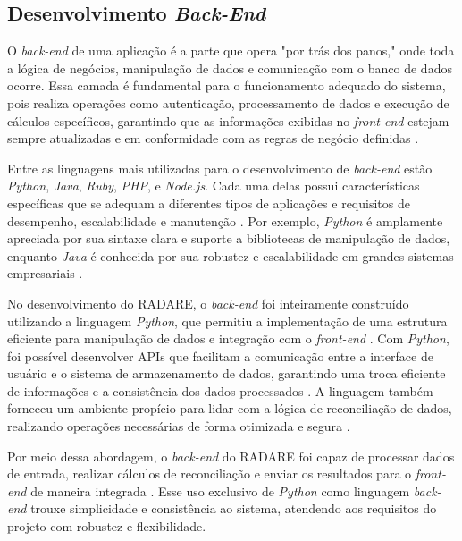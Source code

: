 \subsection{Desenvolvimento \textit{Back-End}}

O \textit{back-end} de uma aplicação é a parte que opera "por trás dos panos," onde toda a lógica de negócios, manipulação de dados e comunicação com o banco de dados ocorre. Essa camada é fundamental para o funcionamento adequado do sistema, pois realiza operações como autenticação, processamento de dados e execução de cálculos específicos, garantindo que as informações exibidas no \textit{front-end} estejam sempre atualizadas e em conformidade com as regras de negócio definidas \cite{backendroles}.

Entre as linguagens mais utilizadas para o desenvolvimento de \textit{back-end} estão \textit{Python}, \textit{Java}, \textit{Ruby}, \textit{PHP}, e \textit{Node.js}. Cada uma delas possui características específicas que se adequam a diferentes tipos de aplicações e requisitos de desempenho, escalabilidade e manutenção \cite{backendlanguages}. Por exemplo, \textit{Python} é amplamente apreciada por sua sintaxe clara e suporte a bibliotecas de manipulação de dados, enquanto \textit{Java} é conhecida por sua robustez e escalabilidade em grandes sistemas empresariais \cite{javabackend}.

No desenvolvimento do RADARE, o \textit{back-end} foi inteiramente construído utilizando a linguagem \textit{Python}, que permitiu a implementação de uma estrutura eficiente para manipulação de dados e integração com o \textit{front-end} \cite{pythonweb}. Com \textit{Python}, foi possível desenvolver APIs que facilitam a comunicação entre a interface de usuário e o sistema de armazenamento de dados, garantindo uma troca eficiente de informações e a consistência dos dados processados \cite{pythonapi}. A linguagem também forneceu um ambiente propício para lidar com a lógica de reconciliação de dados, realizando operações necessárias de forma otimizada e segura \cite{pythondata}.

Por meio dessa abordagem, o \textit{back-end} do RADARE foi capaz de processar dados de entrada, realizar cálculos de reconciliação e enviar os resultados para o \textit{front-end} de maneira integrada \cite{backendworkflow}. Esse uso exclusivo de \textit{Python} como linguagem \textit{back-end} trouxe simplicidade e consistência ao sistema, atendendo aos requisitos do projeto com robustez e flexibilidade.


